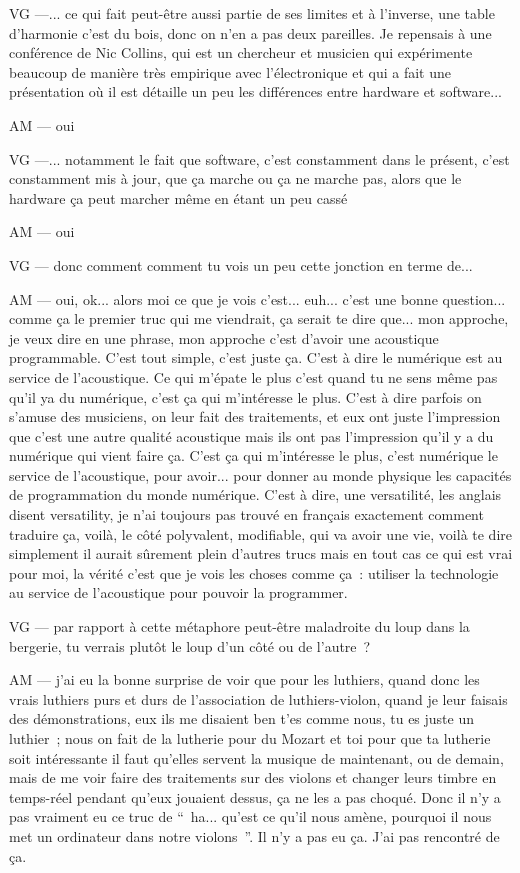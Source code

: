 VG —... ce qui fait peut-être aussi partie de ses limites et à l'inverse, une table d'harmonie c'est du bois, donc on n'en a pas deux pareilles. Je repensais à une conférence de Nic Collins, qui est un chercheur et musicien qui expérimente beaucoup de manière très empirique avec l'électronique et qui a fait une présentation où il est détaille un peu les différences entre hardware et software... 

AM — oui 

VG —... notamment le fait que software, c'est constamment dans le présent, c'est constamment mis à jour, que ça marche ou ça ne marche pas, alors que le hardware ça peut marcher même en étant un peu cassé

AM — oui

VG — donc comment comment tu vois un peu cette jonction en terme de... 

AM — oui, ok... alors moi ce que je vois c'est... euh... c'est une bonne question... comme ça le premier truc qui me viendrait, ça serait te dire que... mon approche, je veux dire en une phrase, mon approche c'est d'avoir une acoustique programmable. C'est tout simple, c'est juste ça. C'est à dire le numérique est au service de l'acoustique. Ce qui m'épate le plus c'est quand tu ne sens même pas qu'il ya du numérique, c'est ça qui m'intéresse le plus. C'est à dire parfois on s'amuse des musiciens, on leur fait des traitements, et eux ont juste l'impression que c'est une autre qualité acoustique mais ils ont pas l'impression qu'il y a du numérique qui vient faire ça. C'est ça qui m'intéresse le plus, c'est numérique le service de l'acoustique, pour avoir... pour donner au monde physique les capacités de programmation du monde numérique. C'est à dire, une versatilité, les anglais disent versatility, je n'ai toujours pas trouvé en français exactement comment traduire ça, voilà, le côté polyvalent, modifiable, qui va avoir une vie, voilà te dire simplement il aurait sûrement plein d'autres trucs mais en tout cas ce qui est vrai pour moi, la vérité c'est que je vois les choses comme ça : utiliser la technologie au service de l'acoustique pour pouvoir la programmer.

VG — par rapport à cette métaphore peut-être maladroite du loup dans la bergerie, tu verrais plutôt le loup d'un côté ou de l'autre ?

AM — j'ai eu la bonne surprise de voir que pour les luthiers, quand donc les vrais luthiers purs et durs de l'association de luthiers-violon, quand je leur faisais des démonstrations, eux ils me disaient ben t'es comme nous, tu es juste un luthier ; nous on fait de la lutherie pour du Mozart et toi pour que ta lutherie soit intéressante il faut qu'elles servent la musique de maintenant, ou  de demain, mais de me voir faire des traitements sur des violons et changer leurs timbre en temps-réel pendant qu'eux jouaient dessus, ça ne les a pas choqué. Donc il n'y a pas vraiment eu ce truc de “ ha... qu'est ce qu'il nous amène, pourquoi il nous met un ordinateur dans notre violons ”. Il n'y a pas eu ça. J'ai pas rencontré de ça. 


